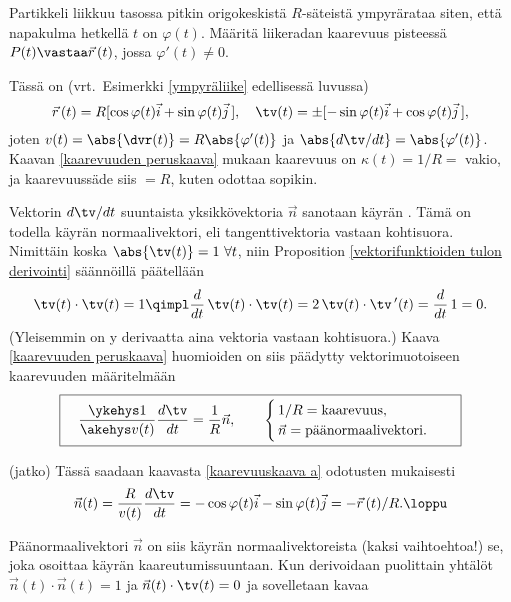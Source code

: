 \begin{Exa} Partikkeli liikkuu tasossa pitkin origokeskistä $R$-säteistä ympyrärataa siten, 
että napakulma hetkellä $t$ on $\varphi(t)$. Määritä liikeradan kaarevuus pisteessä 
$P(t) \vastaa \vec r\,(t)$, jossa $\varphi'(t) \neq 0$. \end{Exa}
\ratk Tässä on (vrt.\ Esimerkki \ref{ympyräliike} edellisessä luvussa)
\[ 
\vec r\,(t) = R[\cos\varphi(t)\vec i + \sin\varphi(t)\vec j\,], \quad  
\tv(t) = \pm[-\sin\varphi(t)\vec i + \cos\varphi(t)\vec j\,], 
\]
joten $v(t)=\abs{\dvr(t)}=R\abs{\varphi'(t)}$ ja $\abs{d\tv/dt}=\abs{\varphi'(t)}$. Kaavan
\eqref{kaarevuuden peruskaava} mukaan kaarevuus on $\kappa(t)=1/R=$ vakio, ja kaarevuussäde
siis $=R$, kuten odottaa sopikin. \loppu

Vektorin $d\tv/dt$ suuntaista yksikkövektoria $\vec n$ sanotaan käyrän 
%
. Tämä on todella käyrän normaalivektori, eli tangenttivektoria 
vastaan kohtisuora. Nimittäin koska $\abs{\tv(t)} = 1\ \forall t$, niin 
Proposition \ref{vektorifunktioiden tulon derivointi} säännöillä päätellään
\[ 
\tv(t)\cdot\tv(t) = 1 \qimpl \frac{d}{dt}\,\tv(t)\cdot\tv(t) 
                              = 2\,\tv(t)\cdot\tv\,'(t) = \frac{d}{dt}\,1 = 0. 
\]
(Yleisemmin on y derivaatta aina vektoria vastaan kohtisuora.) Kaava 
\eqref{kaarevuuden peruskaava} huomioiden on siis päädytty vektorimuotoiseen kaarevuuden
määritelmään
\begin{equation} \label{kaarevuuskaava a}
\boxed{\quad \frac{\ykehys 1}{\akehys v(t)}\frac{d\tv}{dt}
              =\frac{1}{R}\vec n,\qquad \begin{cases} 
                                       \,1/R=\text{kaarevuus}, \\
                                       \,\vec n=\text{päänormaalivektori}. \quad 
                                       \end{cases}}
\end{equation}
\jatko\begin{Exa} (jatko) Tässä saadaan kaavasta \eqref{kaarevuuskaava a} odotusten
mukaisesti
\[
\vec n(t) = \frac{R}{v(t)}\frac{d\tv}{dt} 
          = -\cos\varphi(t)\vec i-\sin\varphi(t)\vec j = -\vec r\,(t)/R. \loppu
\]
\end{Exa}
Päänormaalivektori $\vec n$ on siis käyrän normaalivektoreista (kaksi vaihtoehtoa!) se, joka
osoittaa käyrän kaareutumissuuntaan. Kun derivoidaan puolittain yhtälöt
$\vec n(t)\cdot\vec n(t)=1$ ja $\vec n(t)\cdot\tv(t)=0$ ja sovelletaan kavaa
